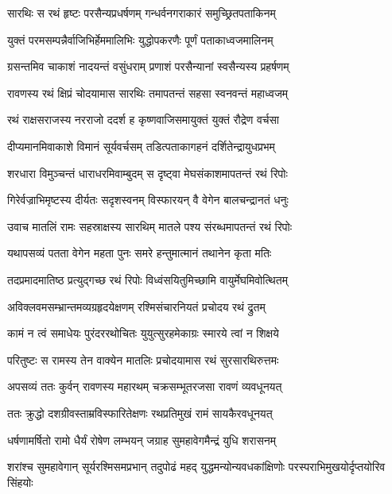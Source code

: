 
\twolineshloka
{सारथिः स रथं हृष्टः परसैन्यप्रधर्षणम्}
{गन्धर्वनगराकारं समुच्छ्रितपताकिनम्} %

\twolineshloka
{युक्तं परमसम्पन्नैर्वाजिभिर्हेममालिभिः}
{युद्धोपकरणैः पूर्णं पताकाध्वजमालिनम्} %

\twolineshloka
{ग्रसन्तमिव चाकाशं नादयन्तं वसुंधराम्}
{प्रणाशं परसैन्यानां स्वसैन्यस्य प्रहर्षणम्} %

\twolineshloka
{रावणस्य रथं क्षिप्रं चोदयामास सारथिः}
{तमापतन्तं सहसा स्वनवन्तं महाध्वजम्} %

\twolineshloka
{रथं राक्षसराजस्य नरराजो ददर्श ह}
{कृष्णवाजिसमायुक्तं युक्तं रौद्रेण वर्चसा} %

\twolineshloka
{दीप्यमानमिवाकाशे विमानं सूर्यवर्चसम्}
{तडित्पताकागहनं दर्शितेन्द्रायुधप्रभम्} %

\twolineshloka
{शरधारा विमुञ्चन्तं धाराधरमिवाम्बुदम्}
{स दृष्ट्वा मेघसंकाशमापतन्तं रथं रिपोः} %

\twolineshloka
{गिरेर्वज्राभिमृष्टस्य दीर्यतः सदृशस्वनम्}
{विस्फारयन् वै वेगेन बालचन्द्रानतं धनुः} %

\twolineshloka
{उवाच मातलिं रामः सहस्राक्षस्य सारथिम्}
{मातले पश्य संरब्धमापतन्तं रथं रिपोः} %

\twolineshloka
{यथापसव्यं पतता वेगेन महता पुनः}
{समरे हन्तुमात्मानं तथानेन कृता मतिः} %

\twolineshloka
{तदप्रमादमातिष्ठ प्रत्युद्गच्छ रथं रिपोः}
{विध्वंसयितुमिच्छामि वायुर्मेघमिवोत्थितम्} %

\twolineshloka
{अविक्लवमसम्भ्रान्तमव्यग्रहृदयेक्षणम्}
{रश्मिसंचारनियतं प्रचोदय रथं द्रुतम्} %

\twolineshloka
{कामं न त्वं समाधेयः पुरंदररथोचितः}
{युयुत्सुरहमेकाग्रः स्मारये त्वां न शिक्षये} %

\twolineshloka
{परितुष्टः स रामस्य तेन वाक्येन मातलिः}
{प्रचोदयामास रथं सुरसारथिरुत्तमः} %

\twolineshloka
{अपसव्यं ततः कुर्वन् रावणस्य महारथम्}
{चक्रसम्भूतरजसा रावणं व्यवधूनयत्} %

\twolineshloka
{ततः क्रुद्धो दशग्रीवस्ताम्रविस्फारितेक्षणः}
{रथप्रतिमुखं रामं सायकैरवधूनयत्} %

\twolineshloka
{धर्षणामर्षितो रामो धैर्यं रोषेण लम्भयन्}
{जग्राह सुमहावेगमैन्द्रं युधि शरासनम्} %

\threelineshloka
{शरांश्च सुमहावेगान् सूर्यरश्मिसमप्रभान्}
{तदुपोढं महद् युद्धमन्योन्यवधकांक्षिणोः}
{परस्पराभिमुखयोर्दृप्तयोरिव सिंहयोः} %


